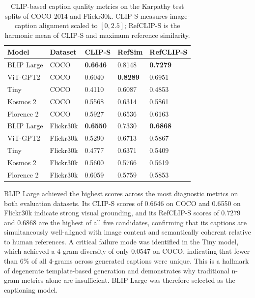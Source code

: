 \begin{table}[ht]
	\centering
	\footnotesize
	\begin{tabular}{lllll}
		\hline
		\textbf{Model}  & \textbf{Dataset}   & \textbf{CLIP-S} &
		\textbf{RefSim} & \textbf{RefCLIP-S}                                                       \\
		\hline
		BLIP Large      & COCO               & \textbf{0.6646} & 0.8148          & \textbf{0.7279} \\
		ViT-GPT2        & COCO               & 0.6040          & \textbf{0.8289} & 0.6951          \\
		Tiny            & COCO               & 0.4110          & 0.6087          & 0.4853          \\
		Kosmos 2        & COCO               & 0.5568          & 0.6314          & 0.5861          \\
		Florence 2      & COCO               & 0.5927          & 0.6536          & 0.6163          \\
		\hline
		BLIP Large      & Flickr30k          & \textbf{0.6550} & 0.7330          & \textbf{0.6868} \\
		ViT-GPT2        & Flickr30k          & 0.5290          & 0.6713          & 0.5867          \\
		Tiny            & Flickr30k          & 0.4777          & 0.6371          & 0.5409          \\
		Kosmos 2        & Flickr30k          & 0.5600          & 0.5766          & 0.5619          \\
		Florence 2      & Flickr30k          & 0.6059          & 0.5759          & 0.5853          \\
		\hline
	\end{tabular}
	\caption{CLIP-based caption quality metrics on the Karpathy test splits of COCO 2014
		and Flickr30k. CLIP-S measures image-caption alignment scaled to $[0, 2.5]$;
		RefCLIP-S is the harmonic mean of CLIP-S and maximum reference similarity.}
	\label{tab:caption_quality_clip}
\end{table}

BLIP Large achieved the highest scores across the most diagnostic metrics on both evaluation datasets. Its CLIP-S scores of 0.6646 on COCO and 0.6550 on Flickr30k indicate strong visual grounding, and its RefCLIP-S scores of 0.7279 and 0.6868 are the highest of all five candidates, confirming that its captions are simultaneously well-aligned with image content and semantically coherent relative to human references. A critical failure mode was identified in the Tiny model, which achieved a 4-gram diversity of only 0.0547 on COCO, indicating that fewer than 6\% of all 4-grams across generated captions were unique. This is a hallmark of degenerate template-based generation and demonstrates why traditional n-gram metrics alone are insufficient. BLIP Large was therefore selected as the captioning model.

